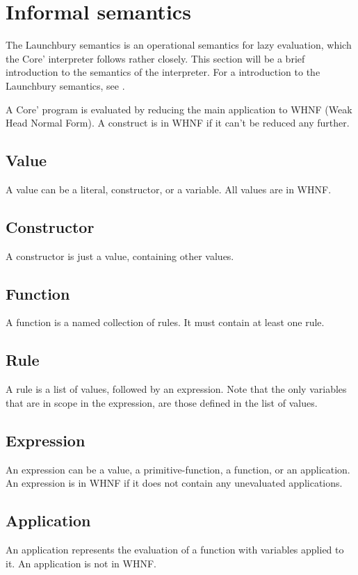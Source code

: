 \section{Informal semantics}

The Launchbury semantics is an operational semantics for 
lazy evaluation, which the Core' interpreter follows rather closely. 
This section will be a brief introduction to the semantics of the interpreter.
For a introduction to 
the Launchbury semantics, see \cite{launchbury1993natural}. 

A Core' program is evaluated by reducing the main application to WHNF 
(Weak Head Normal Form). A construct is in WHNF if it can't be
reduced any further.

\subsection{Value}
A value can be a literal, constructor, or a variable. All values are in WHNF.

\subsection{Constructor}
A constructor is just a value, containing other values.

\subsection{Function}
A function is a named collection of rules. It must contain at least one rule.

\subsection{Rule}
A rule is a list of values, followed by an expression. Note that the only variables
that are in scope in the expression, are those defined in the list of values.

\subsection{Expression}
An expression can be a value, a primitive-function, a function, or an application.
An expression is in WHNF if it does not contain any unevaluated applications.

\subsection{Application}
An application represents the evaluation of a function with variables applied to it.
An application is not in WHNF.

